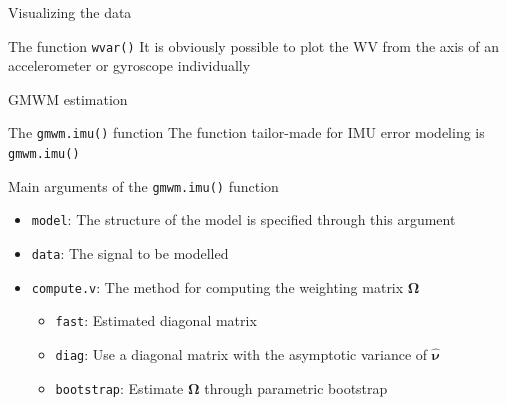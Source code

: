 \documentclass[envcountsect,usenames,dvipsnames]{beamer}
\theoremstyle{mystyle}
\begin{document}
\begin{frame}{Visualizing the data}

\begin{block}{The function {\tt wvar()}}
It is obviously possible to plot the WV from the axis of an accelerometer or gyroscope individually
\end{block}
	\begin{figure}
	  \centering
	\end{figure}
\end{frame}

\begin{frame}{GMWM estimation}

\begin{block}{The {\tt gmwm.imu()} function}
The function tailor-made for IMU error modeling is {\tt gmwm.imu()}
\end{block}

\begin{block}{Main arguments of the {\tt gmwm.imu()} function}

\begin{itemize}
    \item {\tt model}: The structure of the model is specified through this argument
    \item {\tt data}: The signal to be modelled
    \item {\tt compute.v}: The method for computing the weighting matrix $\bm{\Omega}$
    \begin{itemize}
        \item {\tt fast}: Estimated diagonal matrix
        \item {\tt diag}: Use a diagonal matrix with the asymptotic variance of $\bm{\hat{\nu}}$
        \item {\tt bootstrap}: Estimate $\bm{\Omega}$ through parametric bootstrap
    \end{itemize}
\end{itemize}

\end{block}

\end{frame}
\end{document}

